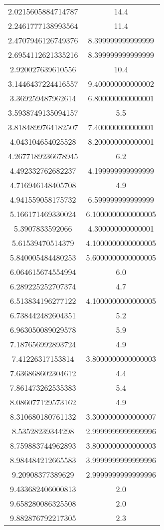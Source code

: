 \begin{table}
\begin{tabular}{S[]S[]}
2.0215605884714787 & 14.4\\
2.2461777138993564 & 11.4\\
2.4707946126749376 & 8.399999999999999\\
2.6954112621335216 & 8.399999999999999\\
2.920027639610556 & 10.4\\
3.1446437224416557 & 9.400000000000002\\
3.369259487962614 & 6.800000000000001\\
3.5938749135094157 & 5.5\\
3.8184899764182507 & 7.400000000000001\\
4.043104654025528 & 8.200000000000001\\
4.2677189236678945 & 6.2\\
4.492332762682237 & 4.199999999999999\\
4.716946148405708 & 4.9\\
4.941559058175732 & 6.599999999999999\\
5.166171469330024 & 6.1000000000000005\\
5.3907833592066 & 4.300000000000001\\
5.61539470514379 & 4.1000000000000005\\
5.840005484480253 & 5.6000000000000005\\
6.064615674554994 & 6.0\\
6.289225252707374 & 4.7\\
6.513834196277122 & 4.1000000000000005\\
6.738442482604351 & 5.2\\
6.963050089029578 & 5.9\\
7.187656992893724 & 4.9\\
7.41226317153814 & 3.8000000000000003\\
7.636868602304612 & 4.4\\
7.861473262535383 & 5.4\\
8.086077129573162 & 4.9\\
8.310680180761132 & 3.3000000000000007\\
8.53528239344298 & 2.9999999999999996\\
8.759883744962893 & 3.8000000000000003\\
8.984484212665583 & 3.9999999999999996\\
9.20908377389629 & 2.9999999999999996\\
9.433682406000813 & 2.0\\
9.658280086325508 & 2.0\\
9.882876792217305 & 2.3\\

\end{tabular}
\end{table}
